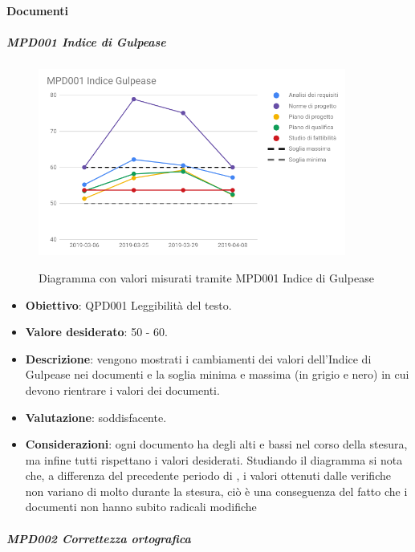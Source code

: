 	\paragraph{Documenti}

		\subparagraph{MPD001 Indice di Gulpease}

		\begin{figure}[H]
			\centering
			\includegraphics[width=0.9\textwidth]{img/cruscotti/RQ/MPD001.png}
			\label{immaginegulpeaseRQ}
			\caption{Diagramma con valori misurati tramite MPD001 Indice di Gulpease}
		\end{figure}

		\begin{itemize}
			\item \textbf{Obiettivo}: QPD001 Leggibilità del testo.
			\item \textbf{Valore desiderato}: 50 - 60.
			\item \textbf{Descrizione}: vengono mostrati i cambiamenti dei valori dell'Indice di Gulpease nei documenti e la soglia minima e massima (in grigio e nero) in cui devono rientrare i valori dei documenti.
			\item \textbf{Valutazione}: soddisfacente.
			\item \textbf{Considerazioni}: ogni documento ha degli alti e bassi nel corso della stesura, ma infine tutti rispettano i valori desiderati. Studiando il diagramma si nota che, a differenza del
			precedente periodo di \RP, i valori ottenuti dalle verifiche non variano di molto durante la
			stesura, ciò è una conseguenza del fatto che i documenti non hanno subito radicali modifiche

		\end{itemize}

		\subparagraph{MPD002 Correttezza ortografica}

